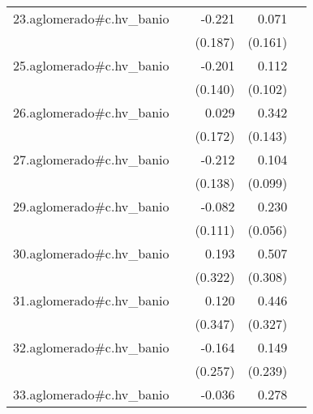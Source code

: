 {\begin{longtable}{l*{4}{D{.}{.}{-1}}}
\addlinespace
23.aglomerado#c.hv\_banio&                     &      -0.221         &       0.071         &                     \\
            &                     &     (0.187)         &     (0.161)         &                     \\
\addlinespace
25.aglomerado#c.hv\_banio&                     &      -0.201         &       0.112         &                     \\
            &                     &     (0.140)         &     (0.102)         &                     \\
\addlinespace
26.aglomerado#c.hv\_banio&                     &       0.029         &       0.342\sym{*}  &                     \\
            &                     &     (0.172)         &     (0.143)         &                     \\
\addlinespace
27.aglomerado#c.hv\_banio&                     &      -0.212         &       0.104         &                     \\
            &                     &     (0.138)         &     (0.099)         &                     \\
\addlinespace
29.aglomerado#c.hv\_banio&                     &      -0.082         &       0.230\sym{***}&                     \\
            &                     &     (0.111)         &     (0.056)         &                     \\
\addlinespace
30.aglomerado#c.hv\_banio&                     &       0.193         &       0.507         &                     \\
            &                     &     (0.322)         &     (0.308)         &                     \\
\addlinespace
31.aglomerado#c.hv\_banio&                     &       0.120         &       0.446         &                     \\
            &                     &     (0.347)         &     (0.327)         &                     \\
\addlinespace
32.aglomerado#c.hv\_banio&                     &      -0.164         &       0.149         &                     \\
            &                     &     (0.257)         &     (0.239)         &                     \\
\addlinespace
33.aglomerado#c.hv\_banio&                     &      -0.036         &       0.278\sym{***}&                     \\

\end{longtable}}

